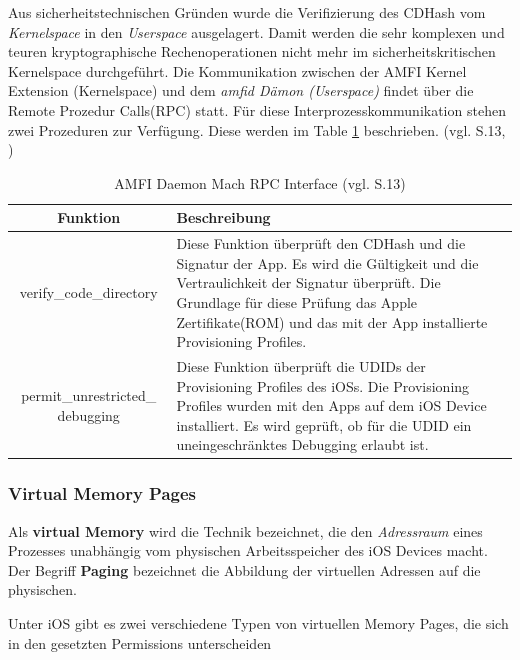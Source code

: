  Aus sicherheitstechnischen Gründen wurde die Verifizierung des CDHash vom \textit{\glqq Kernelspace\grqq{}} in den \textit{\glqq Userspace\grqq{}} ausgelagert. Damit werden die sehr komplexen und teuren kryptographische Rechenoperationen nicht mehr im sicherheitskritischen Kernelspace durchgeführt. Die Kommunikation zwischen der AMFI Kernel Extension (Kernelspace) und dem \textit{\glqq amfid Dämon (Userspace)\grqq{}} findet über die Remote Prozedur Calls(RPC) statt. Für diese Interprozesskommunikation stehen zwei Prozeduren zur Verfügung. Diese werden im Table \ref{tab:AMFID} beschrieben. (vgl. \cite{iOSSec[5]} S.13, \cite{Mach[1]}) 

\begin{table}[ht]
\begin{center}
\begin{tabular}{|c|p{}|} \hline
  Funktion & Beschreibung\\ \hline
verify\_code\_directory &  
Diese Funktion überprüft den CDHash und die Signatur der App. Es wird die Gültigkeit und die Vertraulichkeit der Signatur überprüft. Die Grundlage für diese Prüfung das Apple Zertifikate(ROM) und das mit der App installierte Provisioning Profiles.\\ \hline

permit\_unrestricted\_ debugging &  
Diese Funktion überprüft die UDIDs der Provisioning Profiles des iOSs. Die Provisioning Profiles wurden mit den Apps auf dem iOS Device installiert. Es wird geprüft, ob für die UDID ein uneingeschränktes Debugging erlaubt ist. \\ \hline
\end{tabular} 
\caption{AMFI Daemon Mach RPC Interface (vgl. \cite{iOSSec[5]} S.13)}
\label{tab:AMFID}
\end{center}
\end{table}

\subsubsection{Virtual Memory Pages}
\label{sec:virMemoryPages}
 Als \textbf{virtual Memory} wird die Technik bezeichnet, die den \textit{\glqq Adressraum\grqq{}} eines Prozesses unabhängig vom physischen Arbeitsspeicher des iOS Devices macht. Der Begriff \textbf{Paging} bezeichnet die Abbildung der virtuellen Adressen auf die physischen.\par 
Unter iOS gibt es zwei verschiedene Typen von virtuellen Memory Pages, die sich in den gesetzten Permissions unterscheiden 

